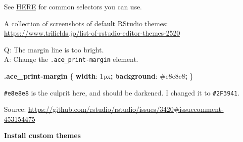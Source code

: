 \documentclass[
  a4paper,
  twoside,
  openright]{book}
\newenvironment{Shaded}{\begin{snugshade}}{\end{snugshade}}
\newcommand{\CharTok}[1]{\textcolor[rgb]{0.31,0.60,0.02}{#1}}
\newcommand{\ConstantTok}[1]{\textcolor[rgb]{0.56,0.35,0.01}{#1}}
\newcommand{\DataTypeTok}[1]{\textcolor[rgb]{0.13,0.29,0.53}{#1}}
\newcommand{\DecValTok}[1]{\textcolor[rgb]{0.00,0.00,0.81}{#1}}
\newcommand{\FunctionTok}[1]{\textcolor[rgb]{0.13,0.29,0.53}{\textbf{#1}}}
\newcommand{\KeywordTok}[1]{\textcolor[rgb]{0.13,0.29,0.53}{\textbf{#1}}}
\newcommand{\NormalTok}[1]{#1}
\newcommand{\OperatorTok}[1]{\textcolor[rgb]{0.81,0.36,0.00}{\textbf{#1}}}
\theoremstyle{definition}
\theoremstyle{definition}
\theoremstyle{definition}
\theoremstyle{definition}
\theoremstyle{remark}
\begin{document}
See \href{https://docs.posit.co/ide/user/ide/guide/ui/appearance.html\#creating-an-rstheme}{HERE} for common selectors you can use.

A collection of screenshots of default RStudio themes: \url{https://www.trifields.jp/list-of-rstudio-editor-themes-2520}

Q: The margin line is too bright.\\
A: Change the \texttt{.ace\_print-margin} element.

\begin{Shaded}
\begin{Highlighting}[]
\FunctionTok{.ace\_print{-}margin}\NormalTok{ \{}
  \KeywordTok{width}\CharTok{:} \DecValTok{1}\DataTypeTok{px}\OperatorTok{;}
  \KeywordTok{background}\CharTok{:} \ConstantTok{\#e8e8e8}\OperatorTok{;}
\NormalTok{\}}
\end{Highlighting}
\end{Shaded}

\texttt{\#e8e8e8} is the culprit here, and should be darkened. I changed it to \texttt{\#2F3941}.

Source: \url{https://github.com/rstudio/rstudio/issues/3420\#issuecomment-453154475}

\textbf{Install custom themes}
\end{document}
